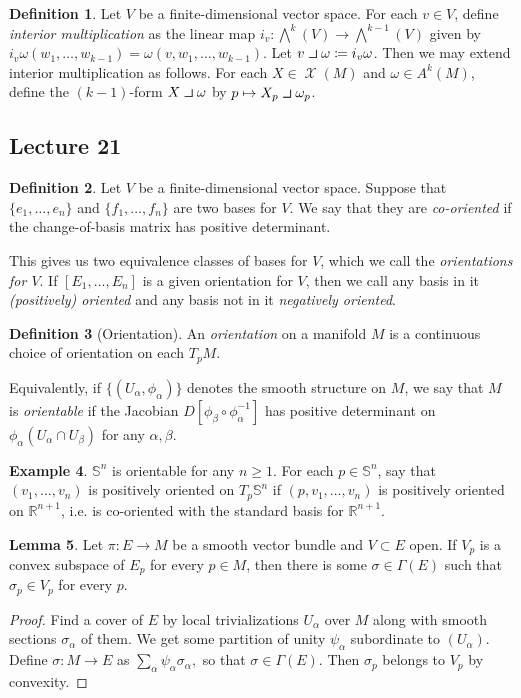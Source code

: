 \documentclass[10pt,letterpaper,cm]{nupset}
\theoremstyle{definition}
\newtheorem{definition}{Definition}[subsection]
\newtheorem{exmp}[definition]{Example}
\theoremstyle{theorem}
\newtheorem{lemma}[definition]{Lemma}
\theoremstyle{remark}
\newcommand{\R}{\mathbb R}
\renewcommand{\S}{\mathbb S}
\newcommand{\1}{\mathbf{1}}
\newcommand{\0}{\vec 0}
\newcommand{\intprodl}{%
    \mathbin{\scalebox{1.5}{$\lrcorner$}}%
}
\DeclareMathOperator{\vf}{\mathscr{X}}
\begin{document}
\begin{definition}
Let $V$ be a finite-dimensional vector space. For each $v\in V$, define \textit{interior multiplication} as the linear map $i_v: \bigwedge^k(V) \to \bigwedge^{k-1}(V)$ given by $i_v \omega(w_1, \ldots, w_{k-1})= \omega(v, w_1, \ldots, w_{k-1}).$ Let $v \intprodl \omega \coloneqq  i_v \omega$. Then we may extend interior multiplication as follows. For each $X \in \vf(M)$ and $\omega \in A^k(M)$, define the $(k-1)$-form $X \intprodl \omega$ by $p\mapsto  X_p \intprodl \omega_p$.
\end{definition}

\subsection{Lecture 21}

\begin{definition}
Let $V$ be a finite-dimensional vector space. Suppose that $\{e_1, \ldots, e_n\}$ and $\{f_1, \ldots, f_n\}$ are two bases for $V$. We say that they are \textit{co-oriented} if the change-of-basis matrix  has positive determinant.
\end{definition}

This gives us two equivalence classes of bases for $V$, which we call the \textit{orientations for $V$}. If $[E_1, \ldots, E_n]$ is a given orientation for $V$, then we call any basis in it \textit{(positively) oriented} and any basis not in it \textit{negatively oriented}.

\begin{definition}[Orientation]
An \textit{orientation} on a manifold $M$ is a continuous choice of orientation on each $T_pM$. 
\end{definition}

Equivalently, if $\{(U_{\alpha}, \phi_{\alpha})\}$ denotes the smooth structure on $M$, we say that $M$ is \textit{orientable} if the Jacobian $D[\phi_{\beta} \circ \phi_{\alpha}^{-1}]$ has positive determinant on $\phi_{\alpha}(U_{\alpha}\cap U_{\beta})$ for any $\alpha, \beta$.


\begin{exmp}
$\S^n$ is orientable for any $n\geq 1$. For each $p \in \S^n$, say that $(v_1, \ldots, v_n)$ is positively oriented on $T_p\S^n$ if $(p, v_1, \ldots, v_n)$ is positively oriented on $\R^{n+1}$, i.e. is co-oriented with the standard basis for $\R^{n+1}$.
\end{exmp}

\begin{lemma}
Let $\pi : E \to M$ be a smooth vector bundle and $V \subset E$ open. If $V_p$ is a convex subspace of $E_p$ for every $p\in M$, then there is some $\sigma \in \Gamma(E)$ such that $\sigma_p \in V_p$ for every $p$.
\end{lemma}
\begin{proof}
Find a cover of $E$ by local trivializations $U_{\alpha}$ over $M$ along with smooth sections $\sigma_{\alpha}$ of them. We get some partition of unity $\psi_{\alpha}$ subordinate to $(U_{\alpha})$. Define $\sigma: M \to E$ as $\sum_{\alpha} \psi_{\alpha}\sigma_{\alpha} ,$ so that $\sigma \in \Gamma(E)$. Then $\sigma_p$ belongs to $V_p$ by convexity.
\end{proof}
\end{document}
